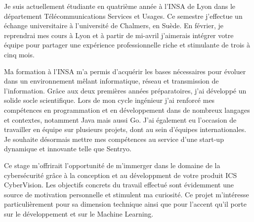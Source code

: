 \documentclass[11pt, a4paper]{awesome-cv}
\begin{document}
\makecvheader[R]


\makelettertitle

\begin{cvletter}

Je suis actuellement étudiante en quatrième année à l'INSA de Lyon dans le département Télécommunications Services et Usages. Ce semestre j'effectue un échange universitaire à l'université de Chalmers, en Suède. En février, je reprendrai mes cours à Lyon et à partir de mi-avril j'aimerais intégrer votre équipe pour partager une expérience professionnelle riche et stimulante de trois à cinq mois.

\vspace{2mm} %

Ma formation à l'INSA m'a permis d'acquérir les bases nécessaires pour évoluer dans un environnement mêlant informatique, réseau et transmission de l'information. Grâce aux deux premières années préparatoires, j'ai développé un solide socle scientifique. Lors de mon cycle ingénieur j'ai renforcé mes compétences en programmation et en développement dans de nombreux langages et contextes, notamment Java mais aussi Go. J'ai également eu l'occasion de travailler en équipe sur plusieurs projets, dont au sein d'équipes internationales. Je souhaite désormais mettre mes compétences au service d'une start-up dynamique et innovante telle que Sentryo.

\vspace{2mm} %

Ce stage m'offrirait l'opportunité de m'immerger dans le domaine de la cybersécurité grâce à la conception et au développment de votre produit ICS CyberVision. Les objectifs concrets du travail effectué sont évidemment une source de motivation personnelle et stimulent ma curiosité. Ce projet m'intéresse particulièrement pour sa dimension technique ainsi que pour l'accent qu'il porte sur le développement et sur le Machine Learning.  %


\end{cvletter}
\end{document}
